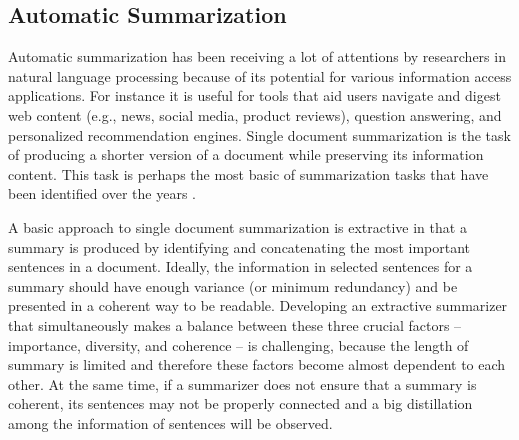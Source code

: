 
\subsection{Automatic Summarization}
\label{subsec:automatic_summarization}
%
Automatic summarization has been receiving a lot of attentions by researchers in natural language processing because of its potential for various information access applications. 
For instance it is useful for tools that aid users navigate and digest web content (e.g., news, social media, product reviews), question answering, and personalized recommendation engines. 
Single document summarization is the task of producing a shorter version of a document while preserving its information content. 
This task is perhaps the most basic of summarization tasks that have been identified over the years \cite{nenkova11}. 

A basic approach to single document summarization is extractive in that a summary is produced by identifying and concatenating the most important sentences in a document. 
Ideally, the information in selected sentences for a summary should have enough variance (or minimum redundancy) and be presented in a coherent way to be readable. 
Developing an extractive summarizer that simultaneously makes a balance between these three crucial factors -- importance, diversity, and coherence -- is challenging, because the length of summary is limited and therefore these factors become almost dependent to each other. 
At the same time, if a summarizer does not ensure that a summary is coherent, its sentences may not be properly connected and a big distillation among the information of sentences will be observed. 

